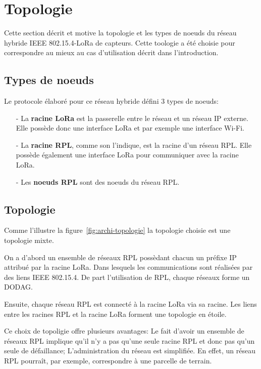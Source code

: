 \section{Topologie}\label{sec:archi-topologie}
\renewcommand{\rightmark}{Topologie}

Cette section décrit et motive la topologie et les types de noeuds du réseau hybride IEEE 802.15.4-LoRa de capteurs. Cette toologie a été choisie pour correspondre au mieux au cas d'utilisation décrit dans l'introduction.

\subsection*{Types de noeuds}
    Le protocole élaboré pour ce réseau hybride défini 3 types de noeuds:
    \begin{itemize}
        \item[-] La \textbf{racine LoRa} est la passerelle entre le réseau et un réseau IP externe. Elle possède donc une interface LoRa et par exemple une interface Wi-Fi.
        \item[-] La \textbf{racine RPL}, comme son l'indique, est la racine d'un réseau RPL. Elle possède également une interface LoRa pour communiquer avec la racine LoRa.
        \item[-] Les \textbf{noeuds RPL} sont des noeuds du réseau RPL.
    \end{itemize}

\subsection*{Topologie}
Comme l'illustre la figure~\ref*{fig:archi-topologie} la topologie choisie est une topologie mixte.

On a d'abord un ensemble de réseaux RPL possèdant chacun un préfixe IP attribué par la racine LoRa. Dans lesquels les communications sont réalisées par des liens IEEE 802.15.4.
De part l'utilisation de RPL, chaque réseaux forme un DODAG.

Ensuite, chaque réseau RPL est connecté à la racine LoRa via sa racine. Les liens entre les racines RPL et la racine LoRa forment une topologie en étoile.

Ce choix de topoligie offre plusieurs avantages: Le fait d'avoir un ensemble de réseaux RPL implique qu'il n'y a pas qu'une seule racine RPL et donc pas qu'un seule de défaillance; L'administration du réseau est simplifiée. En effet, un réseau RPL pourraît, par exemple, correspondre à une parcelle de terrain. 

